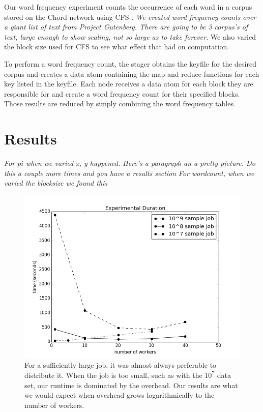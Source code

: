 Our word frequency experiment counts the occurrence of each word in a corpus stored on the Chord network using CFS \cite{CFS}. \textit{We created word frequency counts over a giant list of text from Project Gutenberg.   There are going to be 3 corpus's of text, large enough to show scaling, not so large as to take forever.}   We also varied the block size used for CFS to see what effect that had on computation.  

To perform a word frequency count, the stager obtains the keyfile for the desired corpus and creates a data atom containing the map and reduce functions for each key listed in the keyfile.  Each node receives a data atom for each block they are responsible for and create a word frequency count for their specified blocks.  Those results are reduced by simply combining the word frequency tables. 

\section{Results}

\textit{For $pi$  when we varied x, y happened.  Here's a paragraph an a pretty picture.  Do this a couple more times and you have a results section }\textit{For wordcount, when we varied the blocksize we found this}


\begin{figure}
    \includegraphics[width=0.5\linewidth]{expTime}
    \caption{For a sufficiently large job, it was almost always preferable to distribute it.  When the job is too small, such as with the $10^{7}$ data set, our runtime is dominated by the overhead.  Our results are what we would expect when overhead grows logarithmically to the number of workers.}
    \label{expTime}
\end{figure}


